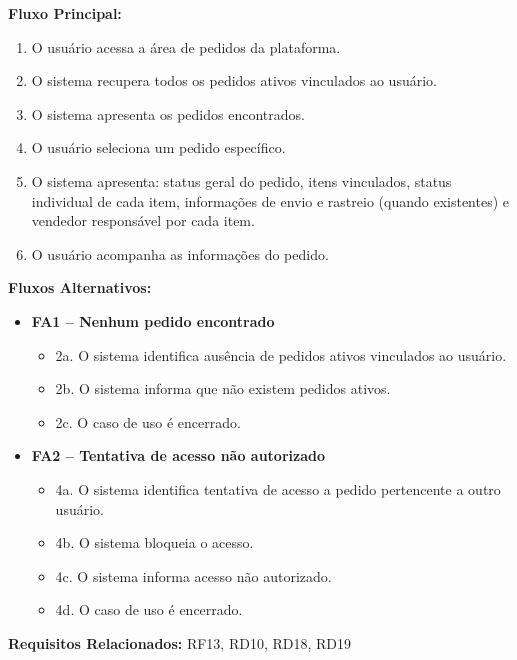 \documentclass[
	article,			%
	11pt,				%
	oneside,			%
	a4paper,			%
	english,			%
	brazil,				%
	sumario=tradicional
	]{abntex2}
\begin{document}
\vspace{0.5em}
\noindent\textbf{Fluxo Principal:}
\begin{enumerate}[label=\arabic*.]
    \item O usuário acessa a área de pedidos da plataforma.
    \item O sistema recupera todos os pedidos ativos vinculados ao usuário.
    \item O sistema apresenta os pedidos encontrados.
    \item O usuário seleciona um pedido específico.
    \item O sistema apresenta: status geral do pedido, itens vinculados, status individual de cada item, informações de envio e rastreio (quando existentes) e vendedor responsável por cada item.
    \item O usuário acompanha as informações do pedido.
\end{enumerate}

\vspace{0.5em}
\noindent\textbf{Fluxos Alternativos:}
\begin{itemize}[leftmargin=*]
    \item \textbf{FA1 – Nenhum pedido encontrado}
    \begin{itemize}[label={}, leftmargin=0.5cm]
        \item 2a. O sistema identifica ausência de pedidos ativos vinculados ao usuário.
        \item 2b. O sistema informa que não existem pedidos ativos.
        \item 2c. O caso de uso é encerrado.
    \end{itemize}
    
    \item \textbf{FA2 – Tentativa de acesso não autorizado}
    \begin{itemize}[label={}, leftmargin=0.5cm]
        \item 4a. O sistema identifica tentativa de acesso a pedido pertencente a outro usuário.
        \item 4b. O sistema bloqueia o acesso.
        \item 4c. O sistema informa acesso não autorizado.
        \item 4d. O caso de uso é encerrado.
    \end{itemize}
\end{itemize}

\vspace{0.5em}
\noindent\textbf{Requisitos Relacionados:} RF13, RD10, RD18, RD19
\end{document}
